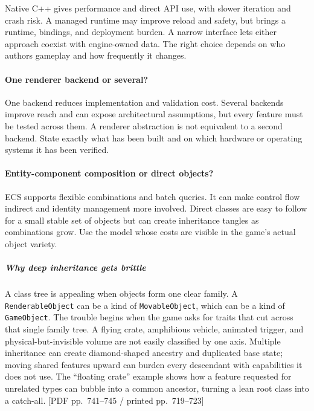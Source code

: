Native C++ gives performance and direct API use, with slower iteration and crash risk. A managed runtime may improve reload and safety, but brings a runtime, bindings, and deployment burden. A narrow interface lets either approach coexist with engine-owned data. The right choice depends on who authors gameplay and how frequently it changes.

\paragraph{One renderer backend or several?}\label{one-renderer-backend-or-several}

One backend reduces implementation and validation cost. Several backends improve reach and can expose architectural assumptions, but every feature must be tested across them. A renderer abstraction is not equivalent to a second backend. State exactly what has been built and on which hardware or operating systems it has been verified.

\paragraph{Entity-component composition or direct objects?}\label{entity-component-composition-or-direct-objects}

ECS supports flexible combinations and batch queries. It can make control flow indirect and identity management more involved. Direct classes are easy to follow for a small stable set of objects but can create inheritance tangles as combinations grow. Use the model whose costs are visible in the game's actual object variety.

\subparagraph{Why deep inheritance gets brittle}\label{why-deep-inheritance-gets-brittle}

A class tree is appealing when objects form one clear family. A \texttt{RenderableObject} can be a kind of \texttt{MovableObject}, which can be a kind of \texttt{GameObject}. The trouble begins when the game asks for traits that cut across that single family tree. A flying crate, amphibious vehicle, animated trigger, and physical-but-invisible volume are not easily classified by one axis. Multiple inheritance can create diamond-shaped ancestry and duplicated base state; moving shared features upward can burden every descendant with capabilities it does not use. The ``floating crate'' example shows how a feature requested for unrelated types can bubble into a common ancestor, turning a lean root class into a catch-all. {[}PDF pp.~741--745 / printed pp.~719--723{]}

